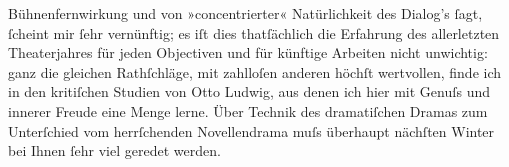 \begin{ledgroupsized}[t]{13cm}
                  Bühnenfernwirkung und von »concentrierter« Natürlichkeit des Dialog’s ſagt,
                  ſcheint mir ſehr vernünftig; {\pb}es iſt dies thatſächlich die Erfahrung des allerletzten Theaterjahres für jeden
                  Objectiven und für künftige Arbeiten nicht unwichtig: ganz die gleichen
                  Rathſchläge, mit zahlloſen anderen höchſt wertvollen, finde ich in den kritiſchen
                  Studien von Otto Ludwig, aus denen ich hier
                  mit Genuſs und innerer Freude eine Menge lerne. Über Technik des dramatiſchen
                  Dramas zum Unterſchied vom herrſchenden Novellendrama muſs überhaupt nächſten
                  Winter bei Ihnen ſehr viel geredet werden.\pend
           
         
         \endnumbering{}\end{ledgroupsized}  \newcommand{\dateiname}{L00111}\newcommand{\titel}{Hugo von Hofmannsthal an Arthur Schnitzler, 4. 8. [1892]}\newcommand{\editorInnen}{Martin Anton Müller und Gerd-Hermann Susen}
      